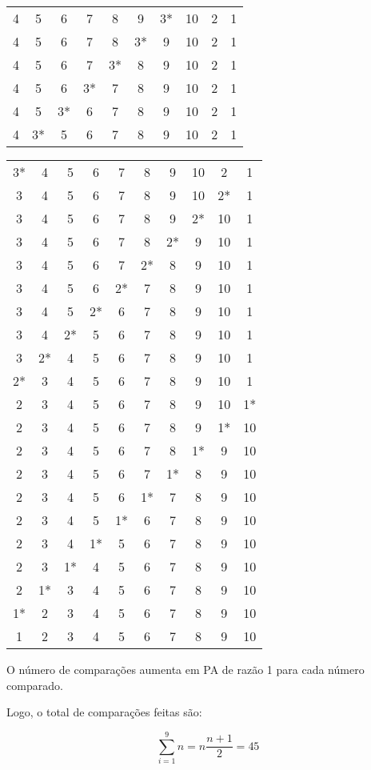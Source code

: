 \begin{center}
\begin{tabular}{cccccccccc}
    4 & 5 & 6 & 7 & 8 & 9 & 3* & 10 & 2 & 1 \\
    4 & 5 & 6 & 7 & 8 & 3* & 9 & 10 & 2 & 1 \\
    4 & 5 & 6 & 7 & 3* & 8 & 9 & 10 & 2 & 1 \\
    4 & 5 & 6 & 3* & 7 & 8 & 9 & 10 & 2 & 1 \\
    4 & 5 & 3* & 6 & 7 & 8 & 9 & 10 & 2 & 1 \\
    4 & 3* & 5 & 6 & 7 & 8 & 9 & 10 & 2 & 1 \\
    \end{tabular}
    \begin{tabular}{cccccccccc}
    3* & 4 & 5 & 6 & 7 & 8 & 9 & 10 & 2 & 1 \\
    3 & 4 & 5 & 6 & 7 & 8 & 9 & 10 & 2* & 1 \\
    3 & 4 & 5 & 6 & 7 & 8 & 9 & 2* & 10 & 1 \\
    3 & 4 & 5 & 6 & 7 & 8 & 2* & 9 & 10 & 1 \\
    3 & 4 & 5 & 6 & 7 & 2* & 8 & 9 & 10 & 1 \\
    3 & 4 & 5 & 6 & 2* & 7 & 8 & 9 & 10 & 1 \\
    3 & 4 & 5 & 2* & 6 & 7 & 8 & 9 & 10 & 1 \\
    3 & 4 & 2* & 5 & 6 & 7 & 8 & 9 & 10 & 1 \\
    3 & 2* & 4 & 5 & 6 & 7 & 8 & 9 & 10 & 1 \\
    2* & 3 & 4 & 5 & 6 & 7 & 8 & 9 & 10 & 1 \\
    2 & 3 & 4 & 5 & 6 & 7 & 8 & 9 & 10 & 1* \\
    2 & 3 & 4 & 5 & 6 & 7 & 8 & 9 & 1* & 10 \\
    2 & 3 & 4 & 5 & 6 & 7 & 8 & 1* & 9 & 10 \\
    2 & 3 & 4 & 5 & 6 & 7 & 1* & 8 & 9 & 10 \\
    2 & 3 & 4 & 5 & 6 & 1* & 7 & 8 & 9 & 10 \\
    2 & 3 & 4 & 5 & 1* & 6 & 7 & 8 & 9 & 10 \\
    2 & 3 & 4 & 1* & 5 & 6 & 7 & 8 & 9 & 10 \\
    2 & 3 & 1* & 4 & 5 & 6 & 7 & 8 & 9 & 10 \\
    2 & 1* & 3 & 4 & 5 & 6 & 7 & 8 & 9 & 10 \\
    1* & 2 & 3 & 4 & 5 & 6 & 7 & 8 & 9 & 10 \\
    1 & 2 & 3 & 4 & 5 & 6 & 7 & 8 & 9 & 10
    \end{tabular}
    \end{center}
    
    O número de comparações aumenta em PA de razão 1 para cada número comparado. 
    
    Logo, o total de comparações feitas são:
    
    \[ \sum_{i=1}^9 n = n \frac{n+1}{2} = 45\]
    
    